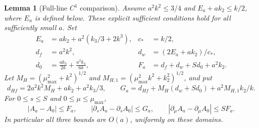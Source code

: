 \documentclass[11pt]{article}
\newtheorem{lemma}[theorem]{Lemma}
\theoremstyle{definition}
\begin{document}
\begin{lemma}[Full-line $C^1$ comparison]
\label{lem:full-lattice-c1}
Assume $a^2k^2\le3/4$ and $E_a+a k_2\le k/2$, where $E_a$ is
defined below. These explicit sufficient conditions hold for all
sufficiently small $a$. Set
\begin{align*}
 E_a&=ak_2+a^2(k_3/3+2k^3), & c_*&=k/2,\\
 d_f&=a^2k^2,&d_w&=(2E_a+ak_2)/c_*,\\
 d_0&=\frac{ak_3}{2k}+\frac{a^2k_4}{6k},
 &F_a&=d_f+d_w+Sd_0+a^2k_2.
\end{align*}
Let $M_H=(\mu_{\max}^2+k^2)^{1/2}$ and
$M_{H,1}=(\mu_{\max}^2k^2+k_2^2)^{1/2}$, and put
\[
 d_{Hf}=2a^2k^2M_H+ak_2+a^2k_3/3,
 \qquad
 G_a=d_{Hf}+M_H(d_w+Sd_0)+a^2M_{H,1}k_2/k.
\]
For $0\le s\le S$ and $0\le\mu\le\mu_{\max}$,
\[
 |A_a-A_0|\le F_a,\qquad
 |\partial_s A_a-\partial_s A_0|\le G_a,
 \qquad
 |\partial_\mu A_a-\partial_\mu A_0|\le SF_a.
\]
In particular all three bounds are $O(a)$, uniformly on these domains.
\end{lemma}
\end{document}
